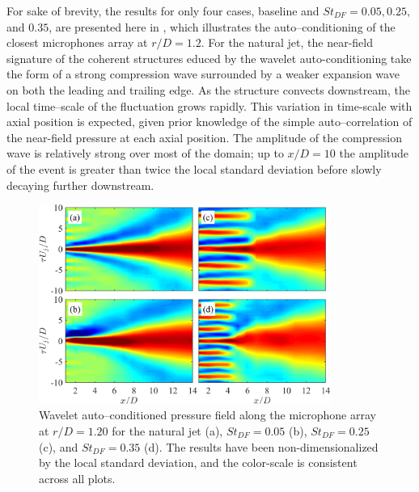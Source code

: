 For sake of brevity, the results for only four cases, baseline and $St_{DF} = 0.05, 0.25,$ and $0.35$, are presented here in , which illustrates the auto--conditioning of the closest microphones array at $r/D = 1.2$.
For the natural jet, the near-field signature of the coherent structures educed by the wavelet auto-conditioning take the form of a strong compression wave surrounded by a weaker expansion wave on both the leading and trailing edge. 
As the structure convects downstream, the local time--scale of the fluctuation grows rapidly.
This variation in time-scale with axial position is expected, given prior knowledge of the simple auto--correlation of the near-field pressure at each axial position.
The amplitude of the compression wave is relatively strong over most of the domain; up to $x/D=10$ the amplitude of the event is greater than twice the local standard deviation before slowly decaying further downstream. 
\begin{figure}
	\centering
	\includegraphics[width=0.85\textwidth]{Figures/wavelet_conditioning.png}
	\caption{Wavelet auto--conditioned pressure field along the microphone array at $r/D = 1.20$ for the natural jet (a), $St_{DF} = 0.05$ (b), $St_{DF} = 0.25$ (c), and $St_{DF} = 0.35$ (d). The results have been non-dimensionalized by the local standard deviation, and the color-scale is consistent across all plots.}
	\label{fig:WaveAutoCond}
\end{figure}

